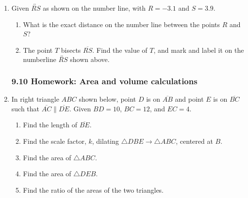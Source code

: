 \documentclass[12pt, twoside]{article}
\begin{document}
\begin{enumerate}
\item Given $\overleftrightarrow{RS}$ as shown on the number line, with $R=-3.1$ and $S=3.9$. \\[20pt] %
  \begin{enumerate}
    \item What is the exact distance on the number line between the points $R$ and $S$? \vspace{2cm} 
    \item The point $T$ bisects $\overline{RS}$. Find the value of $T$, and mark and label it on the numberline $\overleftrightarrow{RS}$ shown above. 
  \end{enumerate} \vspace{2cm} 

\newpage
\subsubsection*{9.10 Homework: Area and volume calculations}
\item In right triangle $ABC$ shown below, point $D$ is on $\overline{AB}$ and point $E$ is on $\overline{BC}$ such that $\overline{AC} \parallel \overline{DE}$. Given $BD=10$, $BC=12$, and $EC=4$.
  \begin{center}
  \end{center}
\begin{enumerate}
  \item Find the length of $\overline{BE}$. \vspace{0.5cm}
  \item Find the scale factor, $k$, dilating $\triangle DBE \rightarrow \triangle ABC$, centered at $B$. \vspace{1.5cm}
  \item Find the area of $\triangle ABC$. \vspace{2.5cm}
  \item Find the area of $\triangle DEB$. \vspace{2.5cm}
  \item Find the ratio of the areas of the two triangles. \vspace{2.5cm}
  \end{enumerate}



\end{enumerate}
\end{document}
